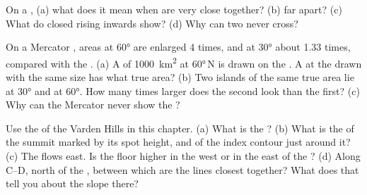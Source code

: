 \begin{exercise}[$\star$]\label{exo:g9:maps-of-the-earth:4}
On a , (a) what does it mean when  are very
close together? (b) far apart? (c) What do closed  rising
inwards show? (d) Why can two  never cross?
\end{exercise}

\begin{exercise}[$\star\star$]\label{exo:g9:maps-of-the-earth:5}
On a Mercator , areas at  \ang{60} are enlarged 4 times, and at
 \ang{30} about 1.33 times, compared with the . (a) A 
of \qty{1000}{km^2} at \ang{60}\,N is drawn on the . A  at the
 drawn with the same size has what true area? (b) Two islands of
the same true area lie at \ang{30} and at \ang{60}. How many times larger
does the second look than the first? (c) Why can the Mercator  never
show the ?
\end{exercise}

\begin{exercise}[$\star\star$]\label{exo:g9:maps-of-the-earth:6}
Use the  of the Varden Hills in this chapter. (a) What is
the ? (b) What is the  of the summit marked by its
spot height, and of the index contour just around it? (c) The  flows
east. Is the  floor higher in the west or in the east of the ?
(d) Along C--D, north of the , between which  are the
lines closest together? What does that tell you about the slope there?
\end{exercise}

